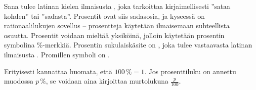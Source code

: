 Sana  tulee latinan kielen ilmaisusta , joka tarkoittaa kirjaimellisesti ''sataa kohden'' tai ''sadasta''. Prosentit ovat siis sadasosia, ja kyseessä on rationaalilukujen sovellus -- prosentteja käytetään ilmaisemaan suhteellista osuutta. Prosentit voidaan mieltää yksiköinä, jolloin käytetään prosentin symbolina \%-merkkiä. Prosentin sukulaiskäsite on , joka tulee vastaavasta latinan ilmaisusta . Promillen symboli on \permil.


Erityisesti kannattaa huomata, että $100\,\%=1$. Jos prosenttiluku on annettu muodossa $p$\,\%, se voidaan aina kirjoittaa murtolukuna $\frac{p}{100}$.

\begin{esimerkki}
\end{esimerkki}

%
%

